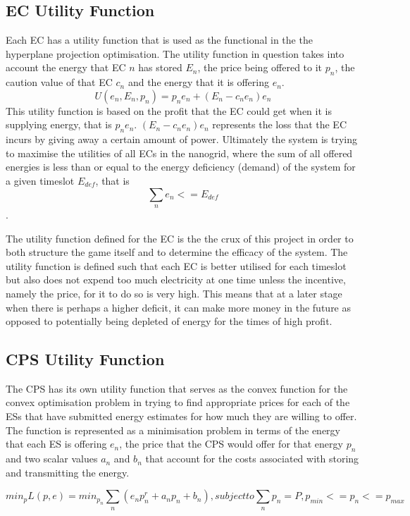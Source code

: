 \documentclass[a4paper, notitlepage]{report}
\begin{document}
\subsection{EC Utility Function}
\label{sec:org6dff951}
Each EC has a utility function that is used as the functional in the the
hyperplane projection optimisation. The utility function in question takes into
account the energy that EC \(n\) has stored \(E_n\), the price being offered to it
\(p_n\), the caution value of that EC \(c_n\) and the energy that it is offering \(e_n\).
$$ U(e_n, E_n, p_n) = p_{n}e_{n} + (E_{n} - c_{n}e_{n})e_{n} $$ 
This utility function is based on the profit that the EC could get when it is
supplying energy, that is \(p_{n}e_{n}\). \((E_{n} - c_{n}e_{n})e_{n}\) represents
the loss that the EC incurs by giving away a certain amount of power. Ultimately
the system is trying to maximise the utilities of all ECs in the nanogrid, where
the sum of all offered energies is less than or equal to the energy deficiency
(demand) of the system for a given timeslot \(E_{def}\), that is $$\sum_n e_n <=
E_{def}$$. 

The utility function defined for the EC is the the crux of this project in order
to both structure the game itself and to determine the efficacy of the system.
The utility function is defined such that each EC is better utilised for each
timeslot but also does not expend too much electricity at one time unless the
incentive, namely the price, for it to do so is very high. This means that at a
later stage when there is perhaps a higher deficit, it can make more money in
the future as opposed to potentially being depleted of energy for the times of
high profit.
\subsection{CPS Utility Function}
\label{sec:orgeb76fc6}
The CPS has its own utility function that serves as the convex function for the
convex optimisation problem in trying to find appropriate prices for each of the
ESs that have submitted energy estimates for how much they are willing to offer.
The function is represented as a minimisation problem in terms of the energy
that each ES is offering \(e_n\), the price that the CPS would offer for that
energy \(p_n\) and two scalar values \(a_n\) and \(b_n\)  that account for the costs
associated with storing and transmitting the energy.

$$min_p L(p,e) = min_{p_{n}} \sum_n(e_{n}p_n^r + a_{n}p_{n} + b_n), subject to
\sum_n p_n = P, p_{min} <= p_n <= p_{max}$$
\end{document}
